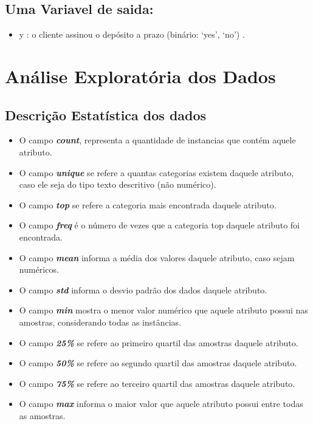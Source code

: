\documentclass[conference]{IEEEtran}
\begin{document}
\subsection{Uma Variavel de saida:}
\begin{itemize}
    \item y : o cliente assinou o depósito a prazo (binário: ‘yes’, ‘no’) .
\end{itemize}


\section{Análise Exploratória dos Dados}
\subsection{Descrição Estatística dos dados}
\begin{itemize}
	\item	O campo \textbf{\textit{count}}, representa a quantidade de instancias que contém aquele atributo.
	\item	O campo \textbf{\textit{unique}} se refere a quantas categorias existem daquele atributo, caso ele seja do tipo texto descritivo (não numérico).
	\item	O campo \textbf{\textit{top}} se refere a categoria mais encontrada daquele atributo.
	\item	O campo \textbf{\textit{freq}} é o número de vezes que a categoria top daquele atributo foi encontrada.
	\item	O campo \textbf{\textit{mean}} informa a média dos valores daquele atributo, caso sejam numéricos.
	\item	O campo \textbf{\textit{std}} informa o desvio padrão dos dados daquele atributo.
	\item	O campo \textbf{\textit{min}} mostra o menor valor numérico que aquele atributo possui nas amostras, considerando todas as instâncias.
	\item	O campo \textbf{\textit{25\%}} se refere ao primeiro quartil das amostras daquele atributo.
	\item	O campo \textbf{\textit{50\%}} se refere ao segundo quartil das amostras daquele atributo.
	\item	O campo \textbf{\textit{75\%}} se refere ao terceiro quartil das amostras daquele atributo.
	\item	O campo \textbf{\textit{max}} informa o maior valor que aquele atributo possui entre todas as amostras.
\end{itemize}
\end{document}
